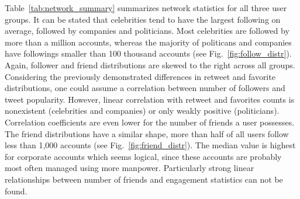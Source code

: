 Table~\ref{tab:network_summary} summarizes network statistics for all three
user groups.
It can be stated that celebrities tend to have the largest following on average,
followed by companies and politicians.
Most celebrities are followed by more than a million accounts, whereas the
majority of politicans and companies have followings smaller than 100 thousand
accounts (see Fig.~\ref{fig:follow_distr}).
Again, follower and friend distributions are skewed to the right across all
groups.
Considering the previously demonstrated differences in retweet and favorite
distributions, one could assume a correlation between number of followers
and tweet popularity.
However, linear correlation with retweet and favorites counts is nonexistent
(celebrities and companies) or only weakly positive (politicians).
Correlation coefficients are even lower for the number of friends a user
possesses.
The friend distributions have a similar shape, more than half of all users
follow less than 1,000 accounts (see Fig.~\ref{fig:friend_distr}).
The median value is highest for corporate accounts which seems logical, since
these accounts are probably most often managed using more manpower.
Particularly strong linear relationships between number of friends and engagement statistics can not
be found.


